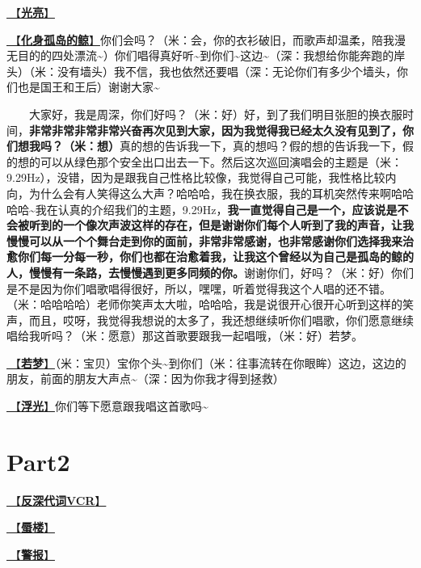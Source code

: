 \documentclass[]{ctexbook}
\begin{document}
\hyperref[silver-linings]{🎵【\textbf{光亮}】}

\hyperref[hua-shen-gu-dao-de-jing]{🎵【\textbf{化身孤岛的鲸}】}你们会吗？（米：会，你的衣衫破旧，而歌声却温柔，陪我漫无目的的四处漂流\textasciitilde）你们唱得真好听\textasciitilde 到你们\textasciitilde 这边\textasciitilde（深：我想给你能奔跑的岸头）（米：没有墙头）我不信，我也依然还要唱（深：无论你们有多少个墙头，你们也是国王和王后）谢谢大家\textasciitilde{}

  大家好，我是周深，你们好吗？（米：好）好，到了我们明目张胆的换衣服时间，\textbf{非常非常非常非常兴奋再次见到大家，因为我觉得我已经太久没有见到了，你们想我吗？（米：想）}真的想的告诉我一下，真的想吗？假的想的告诉我一下，假的想的可以从绿色那个安全出口出去一下。然后这次巡回演唱会的主题是（米：9.29Hz），没错，因为是跟我自己性格比较像，我觉得自己可能，我性格比较内向，为什么会有人笑得这么大声？哈哈哈，我在换衣服，我的耳机突然传来啊哈哈哈哈\textasciitilde 我在认真的介绍我们的主题，9.29Hz，\textbf{我一直觉得自己是一个，应该说是不会被听到的一个像次声波这样的存在，但是谢谢你们每个人听到了我的声音，让我慢慢可以从一个个舞台走到你的面前，非常非常感谢，也非常感谢你们选择我来治愈你们每一分每一秒，你们也都在治愈着我，让我这个曾经以为自己是孤岛的鲸的人，慢慢有一条路，去慢慢遇到更多同频的你。}谢谢你们，好吗？（米：好）你们是不是因为你们唱歌唱得很好，所以，嘿嘿，听着觉得我这个人唱的还不错。（米：哈哈哈哈）老师你笑声太大啦，哈哈哈，我是说很开心很开心听到这样的笑声，而且，哎呀，我觉得我想说的太多了，我还想继续听你们唱歌，你们愿意继续唱给我听吗？（米：愿意）那这首歌要跟我一起唱哦，（米：好）若梦。

\hyperref[ruomeng]{🎵【\textbf{若梦}】}（米：宝贝）宝你个头\textasciitilde 到你们（米：往事流转在你眼眸）这边，这边的朋友，前面的朋友大声点\textasciitilde（深：因为你我才得到拯救）

\hyperref[floating-light]{🎵【\textbf{浮光}】}你们等下愿意跟我唱这首歌吗\textasciitilde{}

\section{Part2}\label{shanghai-20240519-part2}

\hyperref[senself-vcr]{🎥【\textbf{反深代词VCR}】}

\hyperref[mirage]{🎵【\textbf{蜃楼}】}

\hyperref[the-giver]{🎵【\textbf{警报}】}
\end{document}
